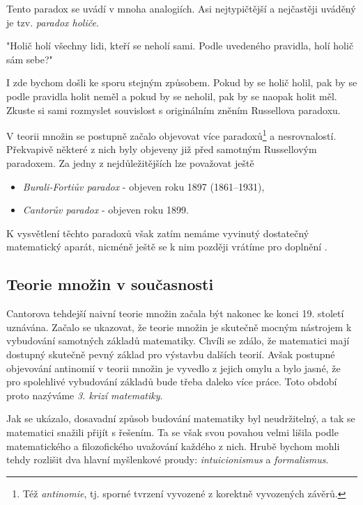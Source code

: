 Tento paradox se uvádí v mnoha analogiích. Asi nejtypičtější a nejčastěji uváděný je tzv. \emph{paradox holiče}.

"Holič holí všechny lidi, kteří se neholí sami. Podle uvedeného pravidla, holí holič sám sebe?"

I zde bychom došli ke sporu stejným způsobem. Pokud by se holič holil, pak by se podle pravidla holit neměl a pokud by se neholil, pak by se naopak holit měl. Zkuste si sami rozmyslet souvislost s originálním zněním Russellova paradoxu.\par
V teorii množin se postupně začalo objevovat více paradoxů\footnote{Též \emph{antinomie}, tj. sporné tvrzení vyvozené z korektně vyvozených závěrů.} a nesrovnalostí. Překvapivě některé z nich byly objeveny již před samotným Russellovým paradoxem. Za jedny z nejdůležitějších lze považovat ještě
\begin{itemize}
\item \emph{Burali-Fortiův paradox} - objeven roku 1897  (1861--1931),
\item \emph{Cantorův paradox} - objeven roku 1899.
\end{itemize}
K vysvětlení těchto paradoxů však zatím nemáme vyvinutý dostatečný matematický aparát, nicméně ještě se k nim později vrátíme pro doplnění .
\subsection{Teorie množin v současnosti}
\label{subsec:tm_soucasnost}
Cantorova tehdejší naivní teorie množin začala být nakonec ke konci 19. století uznávána. Začalo se ukazovat, že teorie množin je skutečně mocným nástrojem k vybudování samotných základů matematiky. Chvíli se zdálo, že matematici mají dostupný skutečně pevný základ pro výstavbu dalších teorií. Avšak postupné objevování antinomií v teorii množin je vyvedlo z jejich omylu a bylo jasné, že pro spolehlivé vybudování základů bude třeba daleko více práce. Toto období proto nazýváme \emph{3. krizí matematiky}.\par
Jak se ukázalo, dosavadní způsob budování matematiky byl neudržitelný, a tak se matematici snažili přijít s řešením. Ta se však svou povahou velmi lišila podle matematického a filozofického uvažování každého z nich. Hrubě bychom mohli tehdy rozlišit dva hlavní myšlenkové proudy: \emph{intuicionismus} a \emph{formalismus}.


